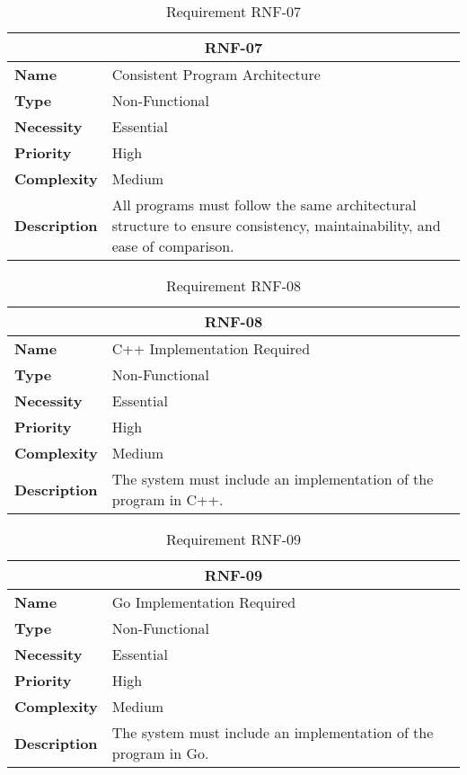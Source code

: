 \begin{table}[H]
    \centering
    \begin{tabular}{l p{10cm}}
        \toprule
        \multicolumn{2}{c}{\textbf{RNF-07}} \\
        \toprule
        \textbf{Name}         & Consistent Program Architecture \\
        \textbf{Type}         & Non-Functional \\
        \textbf{Necessity}    & Essential \\
        \textbf{Priority}     & High \\
        \textbf{Complexity}   & Medium \\
        \textbf{Description}  & All programs must follow the same architectural structure to ensure consistency, maintainability, and ease of comparison. \\
        \bottomrule
    \end{tabular}
\caption{Requirement RNF-07}\label{tab:rnf-07}
\end{table}

\begin{table}[H]
    \centering
    \begin{tabular}{l p{10cm}}
        \toprule
        \multicolumn{2}{c}{\textbf{RNF-08}} \\
        \toprule
        \textbf{Name}         & C++ Implementation Required \\
        \textbf{Type}         & Non-Functional \\
        \textbf{Necessity}    & Essential \\
        \textbf{Priority}     & High \\
        \textbf{Complexity}   & Medium \\
        \textbf{Description}  & The system must include an implementation of the program in C++. \\
        \bottomrule
    \end{tabular}
\caption{Requirement RNF-08}\label{tab:rnf-08}
\end{table}

\begin{table}[H]
    \centering
    \begin{tabular}{l p{10cm}}
        \toprule
        \multicolumn{2}{c}{\textbf{RNF-09}} \\
        \toprule
        \textbf{Name}         & Go Implementation Required \\
        \textbf{Type}         & Non-Functional \\
        \textbf{Necessity}    & Essential \\
        \textbf{Priority}     & High \\
        \textbf{Complexity}   & Medium \\
        \textbf{Description}  & The system must include an implementation of the program in Go. \\
        \bottomrule
    \end{tabular}
\caption{Requirement RNF-09}\label{tab:rnf-09}
\end{table}

